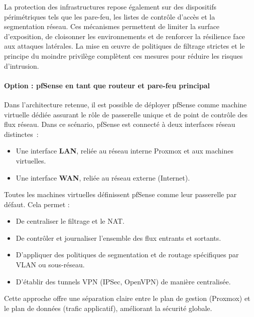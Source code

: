 La protection des infrastructures repose également sur des dispositifs périmétriques tels que les pare-feu, les listes de contrôle d’accès et la segmentation réseau. Ces mécanismes permettent de limiter la surface d’exposition, de cloisonner les environnements et de renforcer la résilience face aux attaques latérales. La mise en œuvre de politiques de filtrage strictes et le principe du moindre privilège complètent ces mesures pour réduire les risques d’intrusion.

\paragraph{Option : pfSense en tant que routeur et pare-feu principal}

Dans l’architecture retenue, il est possible de déployer pfSense comme machine virtuelle dédiée assurant le rôle de passerelle unique et de point de contrôle des flux réseau. Dans ce scénario, pfSense est connecté à deux interfaces réseau distinctes~:
\begin{itemize}
	\item Une interface \textbf{LAN}, reliée au réseau interne Proxmox et aux machines virtuelles.
	\item Une interface \textbf{WAN}, reliée au réseau externe (Internet).
\end{itemize}

Toutes les machines virtuelles définissent pfSense comme leur passerelle par défaut. Cela permet :
\begin{itemize}
	\item De centraliser le filtrage et le NAT.
	\item De contrôler et journaliser l’ensemble des flux entrants et sortants.
	\item D’appliquer des politiques de segmentation et de routage spécifiques par VLAN ou sous-réseau.
	\item D’établir des tunnels VPN (IPSec, OpenVPN) de manière centralisée.
\end{itemize}

Cette approche offre une séparation claire entre le plan de gestion (Proxmox) et le plan de données (trafic applicatif), améliorant la sécurité globale.

